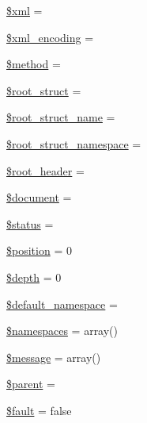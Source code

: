 \begin{DoxyCompactItemize}
\item 
\hyperlink{classnusoap__parser_aa108d9d91e700ac530401dd363b0723b}{\$xml} = \textquotesingle{}\textquotesingle{}
\item 
\hyperlink{classnusoap__parser_a1e2ee3fea6dbb8374da999a9df7d024d}{\$xml\+\_\+encoding} = \textquotesingle{}\textquotesingle{}
\item 
\hyperlink{classnusoap__parser_a12661b2fc0f57f97e30a1620889ce9c6}{\$method} = \textquotesingle{}\textquotesingle{}
\item 
\hyperlink{classnusoap__parser_af3a5b957348b6e993c324ff19bf3b538}{\$root\+\_\+struct} = \textquotesingle{}\textquotesingle{}
\item 
\hyperlink{classnusoap__parser_a5402eddc07a9c8642c2071974fed61b8}{\$root\+\_\+struct\+\_\+name} = \textquotesingle{}\textquotesingle{}
\item 
\hyperlink{classnusoap__parser_ab9fc9293371b688c0cce333416ed5d54}{\$root\+\_\+struct\+\_\+namespace} = \textquotesingle{}\textquotesingle{}
\item 
\hyperlink{classnusoap__parser_a75ccce2909a246d14268f80343725a8f}{\$root\+\_\+header} = \textquotesingle{}\textquotesingle{}
\item 
\hyperlink{classnusoap__parser_ac5a31edb787609a3143dec9bfa8063ea}{\$document} = \textquotesingle{}\textquotesingle{}
\item 
\hyperlink{classnusoap__parser_a58391ea75f2d29d5d708d7050b641c33}{\$status} = \textquotesingle{}\textquotesingle{}
\item 
\hyperlink{classnusoap__parser_a6e88dcb746884d18f6c89eb9b9c14a42}{\$position} = 0
\item 
\hyperlink{classnusoap__parser_a0abb04e6a8a04e161eb4657f54848b18}{\$depth} = 0
\item 
\hyperlink{classnusoap__parser_a3fc29546509a4525391bc5ce2d449cc3}{\$default\+\_\+namespace} = \textquotesingle{}\textquotesingle{}
\item 
\hyperlink{classnusoap__parser_a5a7d9500de9f7c938443d65cef9a074e}{\$namespaces} = array()
\item 
\hyperlink{classnusoap__parser_abf17cb2dba2ed17cb28aa5f37deb5293}{\$message} = array()
\item 
\hyperlink{classnusoap__parser_a4e2313a4b35b72a06ac45fd38960f677}{\$parent} = \textquotesingle{}\textquotesingle{}
\item 
\hyperlink{classnusoap__parser_a365691ed834f59a9a513180136e7a847}{\$fault} = false
\item 

\end{DoxyCompactItemize}
